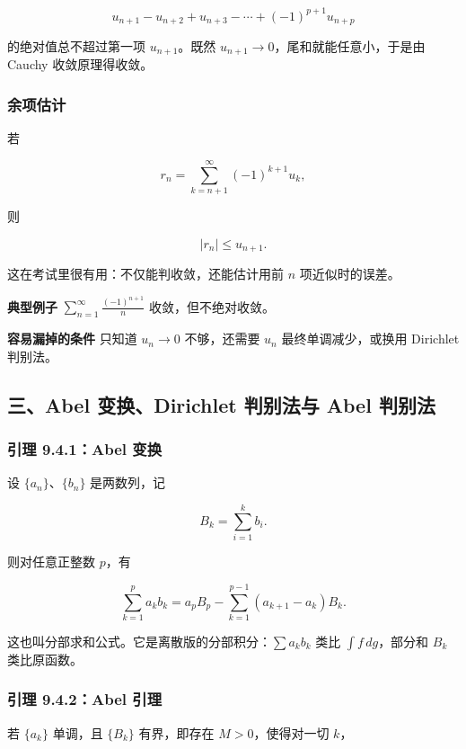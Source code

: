 \[
      u_{n+1}-u_{n+2}+u_{n+3}-\cdots+(-1)^{p+1}u_{n+p}
    \]

的绝对值总不超过第一项 \(u_{n+1}\)。既然 \(u_{n+1}\to0\)，尾和就能任意小，于是由 Cauchy 收敛原理得收敛。

\subsubsection*{余项估计}

若

\[
      r_n=\sum_{k=n+1}^{\infty}(-1)^{k+1}u_k,
    \]

则

\[
      |r_n|\le u_{n+1}.
    \]

这在考试里很有用：不仅能判收敛，还能估计用前 \(n\) 项近似时的误差。

\begin{conceptbox}
\textbf{典型例子}
\(\sum_{n=1}^{\infty}\frac{(-1)^{n+1}}{n}\) 收敛，但不绝对收敛。
\end{conceptbox}

\begin{conceptbox}
\textbf{容易漏掉的条件}
只知道 \(u_n\to0\) 不够，还需要 \(u_n\) 最终单调减少，或换用 Dirichlet 判别法。
\end{conceptbox}

\subsection*{三、Abel 变换、Dirichlet 判别法与 Abel 判别法}

\subsubsection*{引理 9.4.1：Abel 变换}

设 \(\{a_n\}\)、\(\{b_n\}\) 是两数列，记

\[
      B_k=\sum_{i=1}^{k}b_i.
    \]

则对任意正整数 \(p\)，有

\[
      \sum_{k=1}^{p}a_kb_k
      =
      a_pB_p-\sum_{k=1}^{p-1}(a_{k+1}-a_k)B_k.
    \]

这也叫分部求和公式。它是离散版的分部积分：\(\sum a_kb_k\) 类比 \(\int f\,dg\)，部分和 \(B_k\) 类比原函数。

\subsubsection*{引理 9.4.2：Abel 引理}

若 \(\{a_k\}\) 单调，且 \(\{B_k\}\) 有界，即存在 \(M>0\)，使得对一切 \(k\)，

